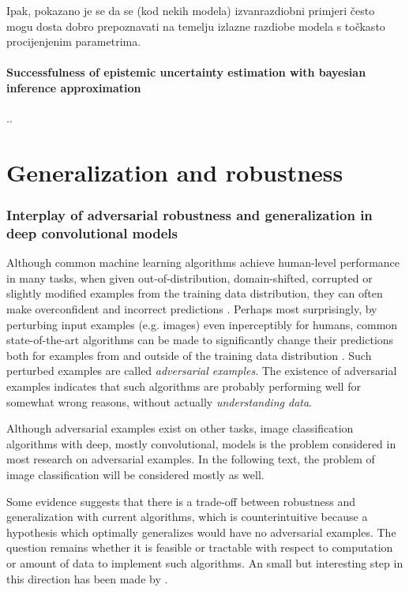 \documentclass{article}
\begin{document}
Ipak, pokazano je se da se (kod nekih modela) izvanrazdiobni primjeri često mogu dosta dobro prepoznavati na temelju izlazne razdiobe modela s točkasto procijenjenim parametrima. 


\subsection{Successfulness of epistemic uncertainty estimation with bayesian inference approximation}



\newpage.\newpage.\newpage
\newpage




\part{Generalization and robustness}



\section{Interplay of adversarial robustness and generalization in deep convolutional models}

Although common machine learning algorithms achieve human-level performance in many tasks, when given out-of-distribution, domain-shifted, corrupted or slightly modified examples from the training data distribution, they can often make overconfident and incorrect predictions \citep{Hendrycks:2016:BDMOODE,Ganin:2015:UDAB,Nguyen:2015:DNNEFHCPUI,Hendrycks:2019:BNNRCCP,Engstrom:2017:RTSFCST,Szegedy:2013:IPNN}. Perhaps most surprisingly, by perturbing input examples (e.g. images) even inperceptibly for humans, common state-of-the-art algorithms can be made to significantly change their predictions both for examples from and outside of the training data distribution \citep{Szegedy:2013:IPNN, Goodfellow:2014:EHAE}. Such perturbed examples are called \textit{adversarial examples}. The existence of adversarial examples indicates that such algorithms are probably performing well for somewhat wrong reasons, without actually \textit{understanding data}.

Although adversarial examples exist on other tasks, image classification algorithms with deep, mostly convolutional, models is the problem considered in most research on adversarial examples. In the following text, the problem of image classification will be considered mostly as well.

Some evidence suggests that there is a trade-off between robustness and generalization \citep{Tsipras:2018:RMBOA,Madry:2017:TDLMRAA,Su:2018:IRTCOACSRDICM} with current algorithms, which is counterintuitive because a hypothesis which optimally generalizes would have no adversarial examples. The question remains whether it is feasible or tractable with respect to computation or amount of data to implement such algorithms. An small but interesting step in this direction has been made by \citep{Stutz:2018:DARG}.
\end{document}
